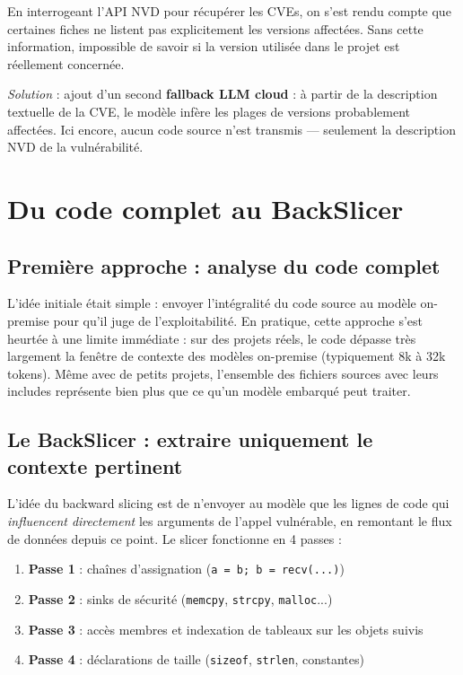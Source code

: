 \documentclass[a4paper, 12pt, hidelinks]{article}
\begin{document}
En interrogeant l'API NVD pour récupérer les CVEs, on s'est rendu compte que certaines fiches ne listent pas explicitement les versions affectées. Sans cette information, impossible de savoir si la version utilisée dans le projet est réellement concernée.

\textit{Solution} : ajout d'un second \textbf{fallback LLM cloud} : à partir de la description textuelle de la CVE, le modèle infère les plages de versions probablement affectées. Ici encore, aucun code source n'est transmis — seulement la description NVD de la vulnérabilité.

\section{Du code complet au BackSlicer}

\subsection*{Première approche : analyse du code complet}

L'idée initiale était simple : envoyer l'intégralité du code source au modèle on-premise pour qu'il juge de l'exploitabilité. En pratique, cette approche s'est heurtée à une limite immédiate : sur des projets réels, le code dépasse très largement la fenêtre de contexte des modèles on-premise (typiquement 8k à 32k tokens). Même avec de petits projets, l'ensemble des fichiers sources avec leurs includes représente bien plus que ce qu'un modèle embarqué peut traiter.

\subsection*{Le BackSlicer : extraire uniquement le contexte pertinent}

L'idée du backward slicing est de n'envoyer au modèle que les lignes de code qui \textit{influencent directement} les arguments de l'appel vulnérable, en remontant le flux de données depuis ce point. Le slicer fonctionne en 4 passes :

\begin{enumerate}
  \item \textbf{Passe 1} : chaînes d'assignation (\texttt{a = b; b = recv(...)})
  \item \textbf{Passe 2} : sinks de sécurité (\texttt{memcpy}, \texttt{strcpy}, \texttt{malloc}...)
  \item \textbf{Passe 3} : accès membres et indexation de tableaux sur les objets suivis
  \item \textbf{Passe 4} : déclarations de taille (\texttt{sizeof}, \texttt{strlen}, constantes)
\end{enumerate}
\end{document}
